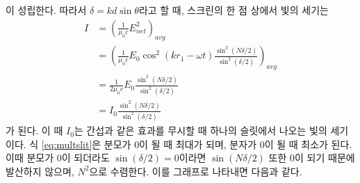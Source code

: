 이 성립한다.  따라서 $\delta = kd\sin\theta$라고 할 때, 스크린의 한 점 상에서 빛의 세기는
\begin{align}
I&=\left(\frac{1}{\mu_0c}E_{net}^2\right)_{avg}\\
&=\left(\frac{1}{\mu_0c}  E_0 \cos^2 (kr_1-\omega t) \frac{\sin^2(N\delta/2)}{\sin^2(\delta/2)}
\right)_{avg}\\
&=\frac{1}{2\mu_0c}  E_0 \frac{\sin^2(N\delta/2)}{\sin^2(\delta/2)}\\
&=I_0 \frac{\sin^2(N\delta/2)}{\sin^2(\delta/2)}\label{eq:multslit}
\end{align}
가 된다. 이 때 $I_0$는 간섭과 같은 효과를 무시할 때 하나의 슬릿에서 나오는 빛의 세기이다. 식 \ref{eq:multslit}은 분모가 0이 될 때 최대가 되며, 분자가 0이 될 때 최소가 된다. 이때 분모가 0이 되더라도 $\sin(\delta/2)=0$이라면 $\sin(N\delta/2)$ 또한 0이 되기 때문에 발산하지 않으며, $N^2$으로 수렴한다. 
이를 그래프로 나타내면 다음과 같다.
